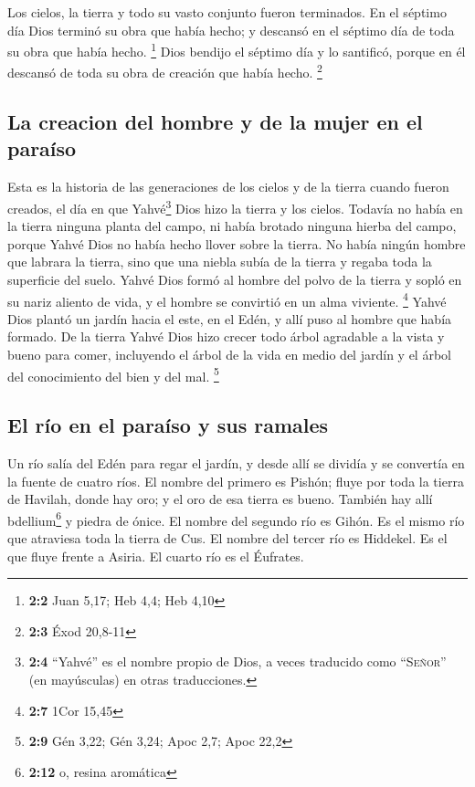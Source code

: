\begin{paracol}{2}
 Los cielos, la tierra y todo su vasto conjunto fueron
terminados.  En el séptimo día Dios terminó su obra que
había hecho; y descansó en el séptimo día de toda su obra que había
hecho. \footnote{\textbf{2:2} Juan 5,17; Heb 4,4; Heb 4,10}
 Dios bendijo el séptimo día y lo santificó, porque en él
descansó de toda su obra de creación que había hecho. \footnote{\textbf{2:3}
  Éxod 20,8-11}

\hypertarget{la-creacion-del-hombre-y-de-la-mujer-en-el-parauxedso}{%
\subsection{La creacion del hombre y de la mujer en el
paraíso}\label{la-creacion-del-hombre-y-de-la-mujer-en-el-parauxedso}}

 Esta es la historia de las generaciones de los cielos y
de la tierra cuando fueron creados, el día en que Yahvé\footnote{\textbf{2:4}
  ``Yahvé'' es el nombre propio de Dios, a veces traducido como
  ``\textsc{Señor}'' (en mayúsculas) en otras traducciones.} Dios hizo
la tierra y los cielos.  Todavía no había en la tierra
ninguna planta del campo, ni había brotado ninguna hierba del campo,
porque Yahvé Dios no había hecho llover sobre la tierra. No había ningún
hombre que labrara la tierra,  sino que una niebla subía
de la tierra y regaba toda la superficie del suelo.  Yahvé
Dios formó al hombre del polvo de la tierra y sopló en su nariz aliento
de vida, y el hombre se convirtió en un alma viviente. \footnote{\textbf{2:7}
  1Cor 15,45}  Yahvé Dios plantó un jardín hacia el este,
en el Edén, y allí puso al hombre que había formado.  De
la tierra Yahvé Dios hizo crecer todo árbol agradable a la vista y bueno
para comer, incluyendo el árbol de la vida en medio del jardín y el
árbol del conocimiento del bien y del mal. \footnote{\textbf{2:9} Gén
  3,22; Gén 3,24; Apoc 2,7; Apoc 22,2}

\hypertarget{el-ruxedo-en-el-parauxedso-y-sus-ramales}{%
\subsection{El río en el paraíso y sus
ramales}\label{el-ruxedo-en-el-parauxedso-y-sus-ramales}}

 Un río salía del Edén para regar el jardín, y desde allí
se dividía y se convertía en la fuente de cuatro ríos. 
El nombre del primero es Pishón; fluye por toda la tierra de Havilah,
donde hay oro;  y el oro de esa tierra es bueno. También
hay allí bdellium\footnote{\textbf{2:12} o, resina aromática} y piedra
de ónice.  El nombre del segundo río es Gihón. Es el
mismo río que atraviesa toda la tierra de Cus.  El nombre
del tercer río es Hiddekel. Es el que fluye frente a Asiria. El cuarto
río es el Éufrates.


\end{paracol}
